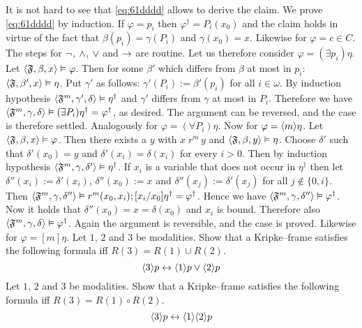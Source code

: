 It is not hard to see that \eqref{eq:61dddd} allows to derive the 
claim. We prove \eqref{eq:61dddd} by induction. If $\varphi = p_i$ 
then $\varphi^{\dagger} = P_i(x_0)$ and the claim holds in virtue 
of the fact that $\beta(p_i) = \gamma(P_i)$ and $\gamma(x_0) = x$. 
Likewise for $\varphi = c \in C$. The steps for $\neg$, $\wedge$, 
$\vee$ and $\rightarrow$ are routine. Let us therefore consider
$\varphi = (\exists p_i)\eta$. Let $\langle \mathfrak{F}, \beta, x\rangle \vDash
\varphi$. Then for some $\beta'$ which differs from $\beta$
at most in $p_i$: $\langle \mathfrak{F}, \beta', x\rangle \vDash \eta$. Put
$\gamma'$ as follows: $\gamma'(P_i) := \beta'(p_i)$ for all
$i \in \omega$. By induction hypothesis
$\langle \mathfrak{F}^m, \gamma', \delta\rangle \vDash \eta^{\dagger}$ and
$\gamma'$ differs from $\gamma$ at most in $P_i$.
Therefore we have $\langle \mathfrak{F}^m, \gamma, \delta\rangle \vDash
(\exists P_i)\eta^{\dagger} = \varphi^{\dagger}$, as desired.
The argument can be reversed, and the case is therefore settled.
Analogously for $\varphi = (\forall P_i)\eta$. Now for
$\varphi = \langle m\rangle\eta$. Let $\auf \GF, \beta, x\zu \vDash %
\varphi$. Then there exists a $y$ with
$x\; r^m\, y$ and $\langle \mathfrak{F}, \beta, y\rangle \vDash \eta$. Choose
$\delta'$ such that $\delta'(x_0) = y$ and
$\delta'(x_i) = \delta(x_i)$ for every $i > 0$. Then by
induction hypothesis $\langle \mathfrak{F}^m, \gamma, \delta'\rangle\vDash
\eta^{\dagger}$. If $x_i$ is a variable that does not occur in
 $\eta^{\dagger}$ then let $\delta''(x_i) := \delta'(x_i)$,
$\delta''(x_0) := x$ and $\delta''(x_j) := \delta'(x_j)$ for all
$j \not\in \{0,i\}$. Then $\langle \mathfrak{F}^m, \gamma, \delta''\rangle\vDash
r^m(x_0,x_i); [x_i/x_0]\eta^{\dagger} = \varphi^{\dagger}$. Hence
we have $\langle \mathfrak{F}^m, \gamma, \delta''\rangle \vDash  \varphi^{\dagger}$.
Now it holds that $\delta''(x_0) = x = \delta(x_0)$ and $x_i$ is
bound. Therefore also $\langle \mathfrak{F}^m, \gamma, \delta\rangle \vDash
\varphi^{\dagger}$.  Again the argument is reversible,
and the case is proved. Likewise for $\varphi = [m]\eta$.
\proofend
\vplatz
\exercise
Let $1$, $2$ and $3$ be modalities. Show that a Kripke--frame 
satisfies the following formula iff $R(3) = R(1) \cup R(2)$.
\begin{equation}
\langle 3\rangle p \leftrightarrow \langle 1\rangle p \vee \langle 2\rangle p
\end{equation}
\vplatz
\exercise
Let $1$, $2$ and $3$ be modalities. Show that a Kripke--frame 
satisfies the following formula iff $R(3) = R(1) \circ R(2)$.
\begin{equation}
\langle 3\rangle p \leftrightarrow \langle 1\rangle \langle 2\rangle p
\end{equation}
